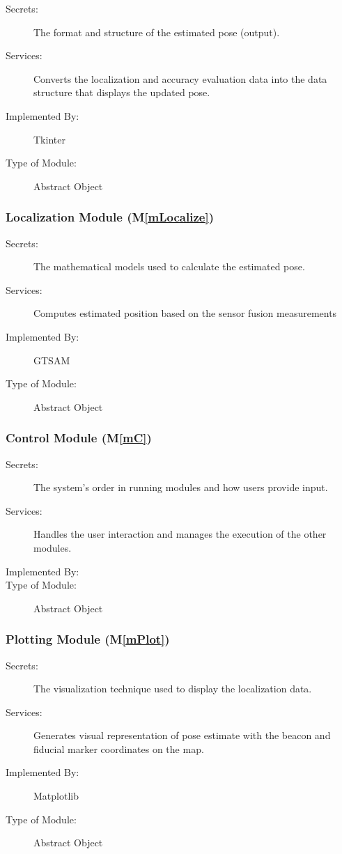 \documentclass[12pt, titlepage]{article}
\newcommand{\mref}[1]{M\ref{#1}}
\begin{document}
\begin{description}
\item[Secrets:]The format and structure of the estimated pose (output).
\item[Services:]Converts the localization and accuracy evaluation data into the data structure that displays the updated pose.
\item[Implemented By:] Tkinter
\item[Type of Module:] Abstract Object
\end{description}

\subsubsection{Localization Module (\mref{mLocalize})}

\begin{description}
\item[Secrets:]The mathematical models used to calculate the estimated pose.
\item[Services:]Computes estimated position based on the sensor fusion measurements
\item[Implemented By:] GTSAM
\item[Type of Module:] Abstract Object
\end{description}

\subsubsection{Control Module (\mref{mC})}

\begin{description}
\item[Secrets:]The system's order in running modules and how users provide input.
\item[Services:]Handles the user interaction and manages the execution of the other modules.
\item[Implemented By:] \progname
\item[Type of Module:] Abstract Object
\end{description}

\subsubsection{Plotting Module (\mref{mPlot})}

\begin{description}
\item[Secrets:]The visualization technique used to display the localization data.
\item[Services:]Generates visual representation of pose estimate with the beacon and fiducial marker coordinates on the map.
\item[Implemented By:] Matplotlib
\item[Type of Module:] Abstract Object
\end{description}
\end{document}
